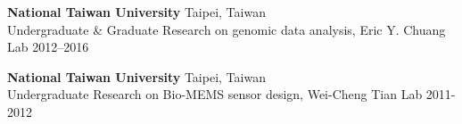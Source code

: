 \begin{outerlist}
	\item \textbf{National Taiwan University} \hfill Taipei, Taiwan\\
	Undergraduate \& Graduate Research on genomic data analysis, Eric Y. Chuang Lab \hfill
	2012--2016

	\item \textbf{National Taiwan University} \hfill Taipei, Taiwan\\
	Undergraduate Research on Bio-MEMS sensor design, Wei-Cheng Tian Lab \hfill
	2011-2012

\end{outerlist}
